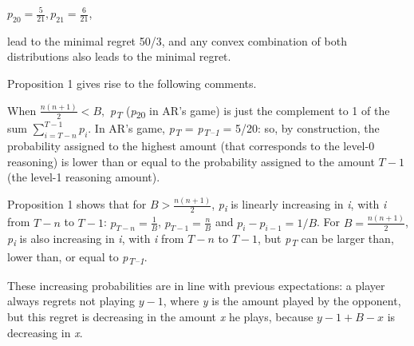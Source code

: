 \begin{Article}
\begin{refsection}[Umbhauer]
{\centering $p_{20} = \frac{5}{21}, p_{21} = \frac{6}{21}$,\par}

\noindent lead to the minimal regret 50/3, and any convex combination of both
distributions also leads to the minimal regret.

Proposition 1 gives rise to the following comments.

When \(\frac{n(n + 1)}{2} < B,\) \emph{p\textsubscript{T}}
(\emph{p}\textsubscript{20} in AR's game) is just the complement to 1 of
the sum \(\sum_{i = T - n}^{T - 1}p_{i}\). In AR's game,
\emph{p\textsubscript{T}} = \emph{p\textsubscript{T--1 }}= 5/20: so, by
construction, the probability assigned to the highest amount (that
corresponds to the level-0 reasoning) is lower than or equal to the
probability assigned to the amount \(T - 1\) (the level-1 reasoning
amount).

Proposition 1 shows that for \(B > \frac{n(n + 1)}{2}\),
\emph{p\textsubscript{i}} is linearly increasing in \emph{i}, with
\emph{i} from \(T - n\) to \(T - 1\):
$p_{T - n} = \frac{1}{B}$, $p_{T - 1} = \frac{n}{B}$ and $p_{i} - p_{i - 1} = 1/B$.
For \(B = \frac{n(n + 1)}{2}\), \emph{p\textsubscript{i}} is also
increasing in \emph{i}, with \emph{i} from \(T - n\) to \(T - 1\), but
\emph{p\textsubscript{T}} can be larger than, lower than, or equal to
\emph{p\textsubscript{T--1}}.

These increasing probabilities are in line with previous expectations: a
player always regrets not playing \(y - 1\), where \emph{y} is the
amount played by the opponent, but this regret is decreasing in the
amount \emph{x} he plays, because \(y - 1 + B - x\) is decreasing in
\emph{x}.


\end{refsection}
\end{Article}
